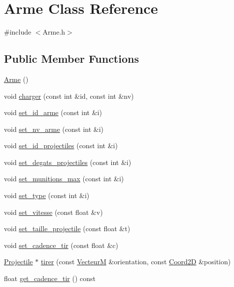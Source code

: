 \hypertarget{classArme}{}\section{Arme Class Reference}
\label{classArme}


{\ttfamily \#include $<$Arme.\+h$>$}

\subsection*{Public Member Functions}
\begin{DoxyCompactItemize}
\item 
\hyperlink{classArme_afb975397e0624d374e759ef586f6a785}{Arme} ()
\item 
void \hyperlink{classArme_ab40a63252769f24988c99f3e6926fca3}{charger} (const int \&id, const int \&nv)
\item 
void \hyperlink{classArme_a457a4dc6749524e21d14edbb5caa3958}{set\+\_\+id\+\_\+arme} (const int \&i)
\item 
void \hyperlink{classArme_aefa883db9062e4f17d789af558b10979}{set\+\_\+nv\+\_\+arme} (const int \&i)
\item 
void \hyperlink{classArme_af4fbdb9a0803c0b12155aa63dcafb915}{set\+\_\+id\+\_\+projectiles} (const int \&i)
\item 
void \hyperlink{classArme_a4196eee3876536db2b6cbf032bc40aa5}{set\+\_\+degats\+\_\+projectiles} (const int \&i)
\item 
void \hyperlink{classArme_a9c547e3a032c015a58e5dcd634d38b9f}{set\+\_\+munitions\+\_\+max} (const int \&i)
\item 
void \hyperlink{classArme_af86cfd4dea10fdebed15b70a85e31744}{set\+\_\+type} (const int \&i)
\item 
void \hyperlink{classArme_a9c63bf380f0a622c3ecdff3e97e2f17f}{set\+\_\+vitesse} (const float \&v)
\item 
void \hyperlink{classArme_a85b5126ad3b2dc288eb40c6e5ea3df2f}{set\+\_\+taille\+\_\+projectile} (const float \&t)
\item 
void \hyperlink{classArme_ae64cbcd61cc344250f11718f910c61dd}{set\+\_\+cadence\+\_\+tir} (const float \&c)
\item 
\hyperlink{classProjectile}{Projectile} $\ast$ \hyperlink{classArme_ad7f968df091bd50e1c9fac3b3fb255fb}{tirer} (const \hyperlink{classVecteurM}{VecteurM} \&orientation, const \hyperlink{classCoord2D}{Coord2D} \&position)
\item 
float \hyperlink{classArme_a29a7f7acbe0bdaa6c13ce5a9254bfcda}{get\+\_\+cadence\+\_\+tir} () const 
\end{DoxyCompactItemize}


